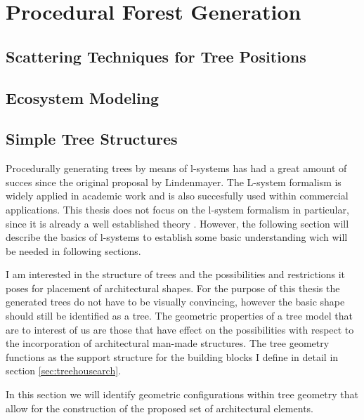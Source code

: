 

\chapter{Procedural Forest Generation}
\label{sec:pfg}



\section{Scattering Techniques for Tree Positions}
\label{subsec:scattering}

\citet{PrzemyslawPlants}


\citet{}

\citet{mickwestgamasutra}
%


\section{Ecosystem Modeling}


\section{Simple Tree Structures}

Procedurally generating trees by means of l-systems has had a great amount of succes since the original proposal by Lindenmayer. The L-system formalism is widely applied in  academic work and is also succesfully used within commercial applications. This thesis does not focus on the l-system formalism in particular, since it is already a well established theory \citet{PrzemyslawAlgoBeauty}. However, the following section will describe the basics of l-systems to establish some basic understanding wich will be needed in following sections. 


I am interested in the structure of trees and the possibilities and restrictions it poses for placement of 
architectural shapes. For the purpose of this thesis the generated trees do not have to be visually convincing, 
however the basic shape should still be identified as a tree. The geometric properties of a tree model that are to interest of us are those that have effect on the possibilities with respect to the incorporation of architectural man-made structures. The tree geometry functions as the support structure for the building blocks I define in detail in section \ref{sec:treehousearch}. 

In this section we will identify geometric configurations within tree geometry that allow for the construction of the proposed set of architectural elements.    

%   
%
%

